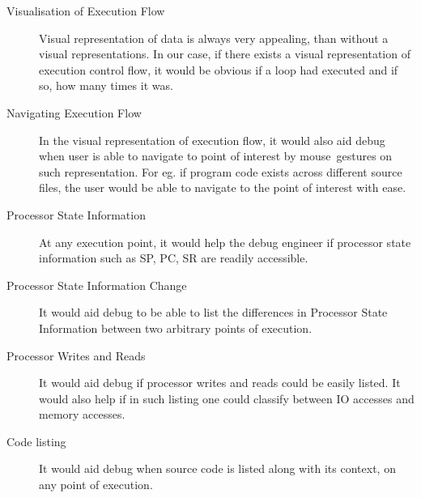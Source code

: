 \begin{description}
\item[Visualisation of Execution Flow] Visual representation of data is always very appealing, than without a visual representations. In our case, if there exists a visual representation of execution control flow, it would be obvious if a loop had executed and if so, how many times it was.
\item[Navigating Execution Flow] In the visual representation of execution flow, it would also aid debug when user is able to navigate to point of interest by mouse~gestures on such representation. For eg. if program code exists across different source files, the user would be able to navigate to the point of interest with ease.
\item[Processor State Information] At any execution point, it would help the debug engineer if processor state information such as SP, PC, SR are readily accessible.
\item[Processor State Information Change] It would aid debug to be able to list the differences in Processor State Information between two arbitrary points of execution.
\item[Processor Writes and Reads] It would aid debug if processor writes and reads could be easily listed. It would also help if in such listing one could classify between IO accesses and memory accesses.
\item[Code listing] It would aid debug when source code is listed along with its context, on any point of execution.
\end{description}

